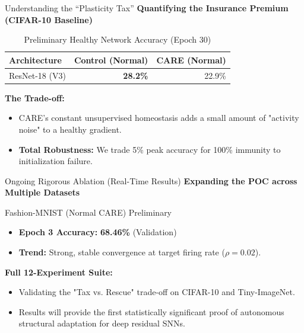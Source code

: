 \documentclass[aspectratio=169]{beamer}
\begin{document}
\begin{frame}{Understanding the ``Plasticity Tax''}
    \textbf{Quantifying the Insurance Premium (CIFAR-10 Baseline)}
    
    \vspace{0.3cm}
    \begin{table}[]
        \centering
        \begin{tabular}{lrr}
            \toprule
            Architecture & Control (Normal) & CARE (Normal) \\
            \midrule
            ResNet-18 (V3) & \textbf{28.2\%} & 22.9\% \\
            \bottomrule
        \end{tabular}
        \caption{Preliminary Healthy Network Accuracy (Epoch 30)}
    \end{table}

    \vspace{0.3cm}
    \textbf{The Trade-off:}
    \begin{itemize}
        \item CARE's constant unsupervised homeostasis adds a small amount of "activity noise" to a healthy gradient.
        \item \textbf{Total Robustness:} We trade 5\% peak accuracy for 100\% immunity to initialization failure.
    \end{itemize}
\end{frame}

\begin{frame}{Ongoing Rigorous Ablation (Real-Time Results)}
    \textbf{Expanding the POC across Multiple Datasets}
    
    \vspace{0.3cm}
    \begin{block}{Fashion-MNIST (Normal CARE) Preliminary}
        \begin{itemize}
            \item \textbf{Epoch 3 Accuracy:} \textbf{68.46\%} (Validation)
            \item \textbf{Trend:} Strong, stable convergence at target firing rate ($\rho=0.02$).
        \end{itemize}
    \end{block}

    \vspace{0.3cm}
    \textbf{Full 12-Experiment Suite:}
    \begin{itemize}
        \item Validating the "Tax vs. Rescue" trade-off on CIFAR-10 and Tiny-ImageNet.
        \item Results will provide the first statistically significant proof of autonomous structural adaptation for deep residual SNNs.
    \end{itemize}
\end{frame}
\end{document}
